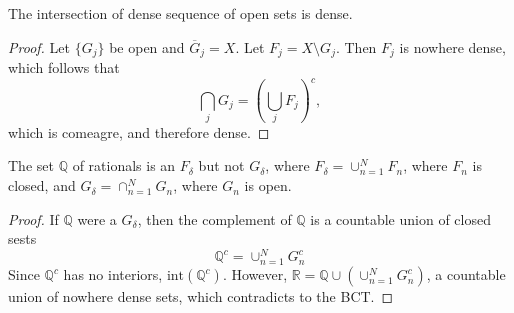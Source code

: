\begin{proposition}
The intersection of dense sequence of open sets is dense.
\end{proposition}
\begin{proof}
Let $\{G_j\}$ be open and $\overline{G}_j = X$.
Let $F_j = X\setminus G_j$.
Then $F_j$ is nowhere dense, which follows that
\[
\bigcap_j G_j = \left(\bigcup_{j}F_j\right)^c,
\]
which is comeagre, and therefore dense.
\end{proof}
\begin{proposition}
The set $\mathbb{Q}$ of rationals is an $F_\delta$ but not $G_\delta$, where $F_\delta = \cup_{n=1}^NF_n$, where $F_n$ is closed, and $G_\delta = \cap_{n=1}^NG_n$, where $G_n$ is open.
\end{proposition}
\begin{proof}
If $\mathbb{Q}$ were a $G_\delta$, then the complement of $\mathbb{Q}$ is a countable union of closed sests 
\[
\mathbb{Q}^c=\cup_{n=1}^NG_n^c
\]
Since $\mathbb{Q}^c$ has no interiors, $\text{int}(\mathbb{Q}^c)$.
However, $\mathbb{R} = \mathbb{Q}\cup(\cup_{n=1}^NG_n^c)$, a countable union of nowhere dense sets, which contradicts to the BCT.
\end{proof}















